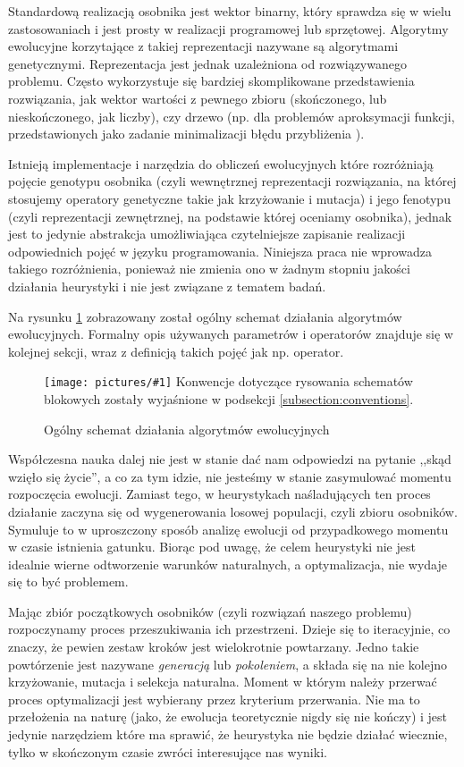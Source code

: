 \documentclass[twoside]{iisthesis}
\newcommand{\img}[1]{\centering \texttt{[image: pictures/\#1]}}
\begin{document}
Standardową realizacją osobnika jest wektor binarny, który sprawdza się w wielu zastosowaniach i jest prosty w realizacji programowej lub sprzętowej. 
Algorytmy ewolucyjne korzytające z takiej reprezentacji nazywane są algorytmami genetycznymi. 
Reprezentacja jest jednak uzależniona od rozwiązywanego problemu. 
Często wykorzystuje się bardziej skomplikowane przedstawienia rozwiązania, jak wektor wartości z pewnego zbioru (skończonego, lub nieskończonego, jak liczby), czy drzewo \cite{gen_prog} (np. dla problemów aproksymacji funkcji, przedstawionych jako zadanie minimalizacji błędu przybliżenia \cite{gen_prog_foo_approx}).

Istnieją implementacje i narzędzia do obliczeń ewolucyjnych które rozróżniają pojęcie genotypu osobnika (czyli wewnętrznej reprezentacji rozwiązania, na której stosujemy operatory genetyczne takie jak krzyżowanie i mutacja) i jego fenotypu (czyli reprezentacji zewnętrznej, na podstawie której oceniamy osobnika), jednak jest to jedynie abstrakcja umożliwiająca czytelniejsze zapisanie realizacji odpowiednich pojęć w języku programowania. Niniejsza praca nie wprowadza takiego rozróżnienia, ponieważ nie zmienia ono w żadnym stopniu jakości działania heurystyki i nie jest związane z tematem badań.

Na rysunku \ref{figure:ea_general} zobrazowany został ogólny schemat działania algorytmów ewolucyjnych. Formalny opis używanych parametrów i operatorów znajduje się w kolejnej sekcji, wraz z definicją takich pojęć jak np. operator.

\begin{figure}
	\caption{Ogólny schemat działania algorytmów ewolucyjnych
		\label{figure:ea_general}
		}
	\img{ea_general.png}
	Konwencje dotyczące rysowania schematów blokowych zostały wyjaśnione w podsekcji \ref{subsection:conventions}.
\end{figure}

Współczesna nauka dalej nie jest w stanie dać nam odpowiedzi na pytanie ,,skąd wzięło się życie'', a co za tym idzie, nie jesteśmy w stanie zasymulować momentu rozpoczęcia ewolucji.
Zamiast tego, w heurystykach naśladujących ten proces działanie zaczyna się od wygenerowania losowej populacji, czyli zbioru osobników. 
Symuluje to w uproszczony sposób analizę ewolucji od przypadkowego momentu w czasie istnienia gatunku.
Biorąc pod uwagę, że celem heurystyki nie jest idealnie wierne odtworzenie warunków naturalnych, a optymalizacja, nie wydaje się to być problemem.

Mając zbiór początkowych osobników (czyli rozwiązań naszego problemu) rozpoczynamy proces przeszukiwania ich przestrzeni.
Dzieje się to iteracyjnie, co znaczy, że pewien zestaw kroków jest wielokrotnie powtarzany.
Jedno takie powtórzenie jest nazywane \emph{generacją} lub \emph{pokoleniem}, a składa się na nie kolejno krzyżowanie, mutacja i selekcja naturalna.
Moment w którym należy przerwać proces optymalizacji jest wybierany przez kryterium przerwania. 
Nie ma to przełożenia na naturę (jako, że ewolucja teoretycznie nigdy się nie kończy) i jest jedynie narzędziem które ma sprawić, że heurystyka nie będzie działać wiecznie, tylko w skończonym czasie zwróci interesujące nas wyniki.
\end{document}
